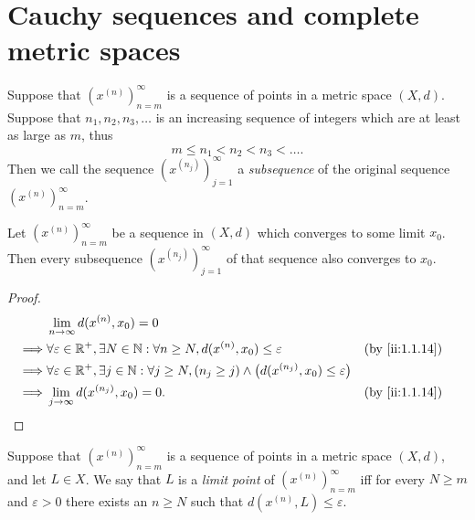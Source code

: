 \section{Cauchy sequences and complete metric spaces}\label{ii:sec:1.4}

\begin{defn}[Subsequences]\label{ii:1.4.1}
  Suppose that \((x^{(n)})_{n = m}^\infty\) is a sequence of points in a metric space \((X, d)\).
  Suppose that \(n_1, n_2, n_3, \dots\) is an increasing sequence of integers which are at least as large as \(m\), thus
  \[
    m \leq n_1 < n_2 < n_3 < \dots.
  \]
  Then we call the sequence \((x^{(n_j)})_{j = 1}^\infty\) a \emph{subsequence} of the original sequence \((x^{(n)})_{n = m}^\infty\).
\end{defn}

\setcounter{thm}{2}
\begin{lem}\label{ii:1.4.3}
  Let \((x^{(n)})_{n = m}^\infty\) be a sequence in \((X, d)\) which converges to some limit \(x_0\).
  Then every subsequence \((x^{(n_j)})_{j = 1}^\infty\) of that sequence also converges to \(x_0\).
\end{lem}

\begin{proof}
  \begin{align*}
             & \lim_{n \to \infty} d(x^{(n)}, x_0) = 0                                                                                                             \\
    \implies & \forall \varepsilon \in \R^+, \exists N \in \N : \forall n \geq N, d(x^{(n)}, x_0) \leq \varepsilon                                &  & \by{ii:1.1.14} \\
    \implies & \forall \varepsilon \in \R^+, \exists j \in \N : \forall j \geq N, (n_j \geq j) \land \big(d(x^{(n_j)}, x_0) \leq \varepsilon\big)                  \\
    \implies & \lim_{j \to \infty} d(x^{(n_j)}, x_0) = 0.                                                                                         &  & \by{ii:1.1.14}
  \end{align*}
\end{proof}

\begin{defn}\label{ii:1.4.4}
  Suppose that \((x^{(n)})_{n = m}^\infty\) is a sequence of points in a metric space \((X, d)\), and let \(L \in X\).
  We say that \(L\) is a \emph{limit point} of \((x^{(n)})_{n = m}^\infty\) iff for every \(N \geq m\) and \(\varepsilon > 0\) there exists an \(n \geq N\) such that \(d(x^{(n)}, L) \leq \varepsilon\).
\end{defn}

